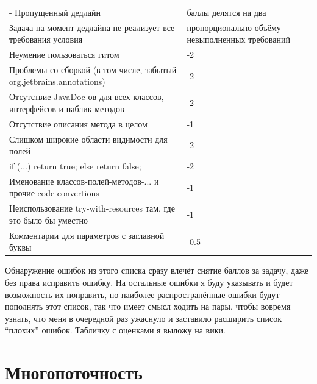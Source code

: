 \documentclass[a5paper]{article}
\begin{document}
\vspace{3mm}
\begin{small}
	\begin{tabu} {| X[1 l p] | X[0.3 l p] |}
		\tabucline-
		\everyrow{\tabucline-}
		Пропущенный дедлайн                                                                   & баллы делятся на два \\
		Задача на момент дедлайна не реализует все требования условия                         & пропорционально объёму невыполненных требований \\
		Неумение пользоваться гитом                                                           & -2 \\
		Проблемы со сборкой (в том числе, забытый org.jetbrains.annotations)                  & -2 \\
		Отсутствие JavaDoc-ов для всех классов, интерфейсов и паблик-методов                  & -2 \\
		Отсутствие описания метода в целом                                                    & -1 \\
		Слишком широкие области видимости для полей                                           & -2 \\
		if (...) return true; else return false;                                              & -2 \\
		Именование классов-полей-методов-... и прочие code convertions                        & -1 \\
		Неиспользование try-with-resources там, где это было бы уместно                       & -1 \\
		Комментарии для параметров с заглавной буквы                                          & -0.5 \\
	\end{tabu}
\end{small}
\vspace{3mm}

Обнаружение ошибок из этого списка сразу влечёт снятие баллов за задачу, даже без права исправить ошибку. На остальные ошибки я буду указывать и будет возможность их поправить, но наиболее распространённые ошибки будут пополнять этот список, так что имеет смысл ходить на пары, чтобы вовремя узнать, что меня в очередной раз ужаснуло и заставило расширить список ``плохих'' ошибок. Табличку с оценками я выложу на вики.

\section{Многопоточность}
\end{document}
